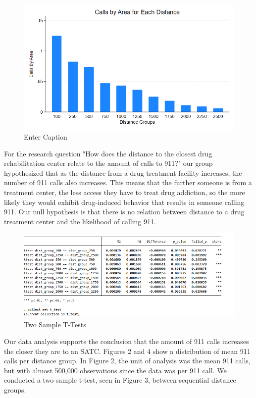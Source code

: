 \documentclass[12pt]{article}
\begin{document}
\begin{figure}[ht]
    \centering
    \includegraphics[width=1\linewidth]{Reproducibility Package//Visual Graphics/Avg_Calls_per_Distance_Group.png}
    \caption{Enter Caption}
    \label{fig: Average Number of Calls per Distance Group}
\end{figure}
For the research question "How does the distance to the closest drug rehabilitation center relate to the amount of calls to 911?" our group hypothesized that as the distance from a drug treatment facility increases, the number of 911 calls also increases. This means that the further someone is from a treatment center, the less access they have to treat drug addiction, so the more likely they would exhibit drug-induced behavior that results in someone calling 911. Our null hypothesis is that there is no relation between distance to a drug treatment center and the likelihood of calling 911. 
\begin{figure}[h]
    \centering
    \includegraphics[width=1\linewidth]{Reproducibility Package//Visual Graphics/t_test_ss.png}
    \caption{Two Sample T-Tests}
    \label{fig:enter-label}
\end{figure}
Our data analysis supports the conclusion that the amount of 911 calls increases the closer they are to an SATC. Figures 2 and 4 show a distribution of mean 911 calls per distance group. In Figure 2, the unit of analysis was the mean 911 calls, but with almost 500,000 observations since the data was per 911 call. We conducted a two-sample t-test, seen in Figure 3, between sequential distance groups. 
\end{document}
